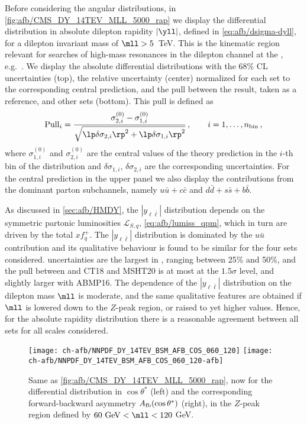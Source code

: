 Before considering the angular distributions, in
\cref{fig:afb/CMS_DY_14TEV_MLL_5000_rap} we display the 
differential distribution in absolute dilepton rapidity $|\yll|$,
defined in \cref{eq:afb/dsigma-dyll},
for a dilepton invariant mass of $\mll > 5$~TeV.
%
This is the kinematic region relevant for searches of high-mass resonances
in the dilepton channel at the \lhc, e.g.~\cite{ATLAS:2019erb,Khachatryan:2016zqb}.
%
We display the absolute differential distributions with the 68\% CL \pdf uncertainties
(top), the relative \pdf uncertainty (center) normalized for each \pdf
set to the corresponding central prediction, and the pull between the
 result, taken as a reference, and other sets (bottom).
%
This pull is    defined as
    \begin{equation}
\label{eq:afb/pulldef_xsec}
{\rm Pull}_i= \frac{ \sigma^{(0)}_{2,i} -\sigma^{(0)}_{1,i} }{
  \sqrt{ \lp  \delta \sigma_{2,i}\rp^2+\lp  \delta \sigma_{1,i}\rp^2 }} \, , \qquad i=1,\ldots,n_{\rm bin} \, ,
\end{equation}
where  $\sigma^{(0)}_{1,i}$ and $\sigma^{(0)}_{2,i}$ are the central values of the
theory prediction in the $i$-th bin of the distribution and $\delta \sigma_{1,i}$, $\delta \sigma_{2,i}$ are
the corresponding \pdf uncertainties.
%
For the central  prediction in the upper panel we also display the
contributions from the dominant parton subchannels, namely
$u\bar{u}+c\bar{c}$ and $d\bar{d}+s\bar{s}+b\bar{b}$.

As discussed in \cref{sec:afb/HMDY}, the  $|y_{\ell\bar{\ell}}|$  distribution
depends  on the symmetric partonic luminosities $\mathcal{L}_{S,q}$, \cref{eq:afb/lumiss_qpm},
which in turn are driven by the total \pdfs $xf^+_q$.
%
The $|y_{\ell\bar{\ell}}|$  distribution
is dominated by the $u\bar{u}$
contribution and its qualitative behaviour is found to be similar for the four \pdf sets considered.
%
\pdf uncertainties are the largest in , ranging between 25\% and 50\%,
and the pull between  and  CT18 and MSHT20 is at most at the
$1.5\sigma$ level, and slightly larger  
with ABMP16.
%
The dependence of the $|y_{\ell\bar{\ell}}|$  distribution on the dilepton mass $\mll$
is moderate, and the same qualitative features are
obtained if $\mll$ is lowered down to the $Z$-peak region, or
raised to yet higher values.
%
Hence, for the absolute rapidity distribution there is a
reasonable agreement between all  \pdf sets for all scales considered.

\begin{figure}[t]
\centering
\texttt{[image: ch-afb/NNPDF\_DY\_14TEV\_BSM\_AFB\_COS\_060\_120]}
\texttt{[image: ch-afb/NNPDF\_DY\_14TEV\_BSM\_AFB\_COS\_060\_120-afb]}
\caption{Same as \cref{fig:afb/CMS_DY_14TEV_MLL_5000_rap}, now for the differential distribution in
  $\cos\theta^*$ (left)
  and the corresponding forward-backward asymmetry
  $A_{\rm fb}(\cos\theta^*)$ (right), in the $Z$-peak region defined by $60~{\rm GeV} < \mll < 120$ GeV.}
\label{fig:afb/CMS_DY_14TEV_MLL_zpeak}
\end{figure}

